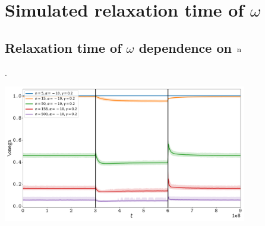 \documentclass{article}
\renewcommand*{\bm}[1]{#1}%
\begin{document}

\section{Simulated relaxation time of $\bm{\omega}$}

\subsection{Relaxation time of $\bm{\omega}$ dependence on $\text{n}$}.
\begin{center}
 \includegraphics[width=0.8\textwidth] {artworks/Relaxation-Stability.pdf}
\end{center}
\end{document}
